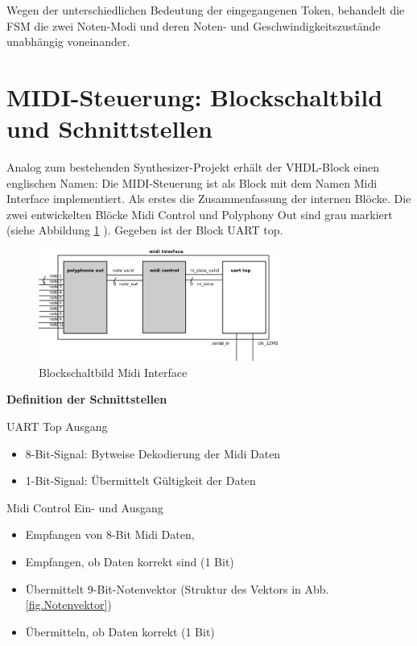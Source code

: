Wegen der unterschiedlichen Bedeutung der eingegangenen Token, behandelt die FSM die zwei Noten-Modi und deren Noten- und Geschwindigkeitszustände unabhängig voneinander.


\section{MIDI-Steuerung: Blockschaltbild und Schnittstellen}

Analog zum bestehenden Synthesizer-Projekt erhält der VHDL-Block einen englischen Namen: Die MIDI-Steuerung ist als Block mit dem Namen Midi Interface implementiert. Als erstes die Zusammenfassung der internen Blöcke. Die zwei entwickelten Blöcke Midi Control und Polyphony Out sind grau markiert (siehe Abbildung \ref{fig.midi_interface_block} ). Gegeben ist der Block UART top.

\begin{figure}[H]
	\includegraphics[width=0.7\textwidth]{images/midi_interface/midi_interface_block.png}
	\caption{Blockschaltbild Midi Interface}
	\label{fig.midi_interface_block}
\end{figure}

\textbf{Definition der Schnittstellen}\label{schnittstellen}

UART Top Ausgang

\begin{itemize}
	\item 8-Bit-Signal: Bytweise Dekodierung der Midi Daten 
	\item 1-Bit-Signal: Übermittelt Gültigkeit der Daten
\end{itemize}

Midi Control Ein- und Ausgang

\begin{itemize}
	\item Empfangen von 8-Bit Midi Daten,
    \item Empfangen, ob Daten korrekt sind (1 Bit)
	\item Übermittelt 9-Bit-Notenvektor (Struktur des Vektors in Abb.\ref{fig.Notenvektor})
    \item Übermitteln, ob Daten korrekt (1 Bit)
\end{itemize}


